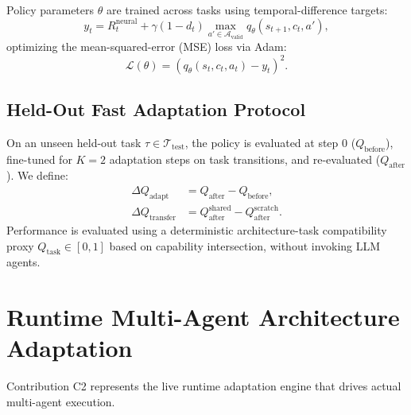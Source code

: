 \documentclass[conference]{IEEEtran}
\begin{document}
Policy parameters $\theta$ are trained across tasks using temporal-difference targets:
\begin{equation}
y_t = R_t^{\mathrm{neural}} + \gamma (1 - d_t) \max_{a' \in \mathcal{A}_{\mathrm{valid}}} q_\theta(s_{t+1}, c_t, a'),
\end{equation}
optimizing the mean-squared-error (MSE) loss via Adam:
\begin{equation}
\mathcal{L}(\theta) = \left(q_\theta(s_t, c_t, a_t) - y_t\right)^2.
\end{equation}

\subsection{Held-Out Fast Adaptation Protocol}
On an unseen held-out task $\tau \in \mathcal{T}_{\mathrm{test}}$, the policy is evaluated at step 0 ($Q_{\mathrm{before}}$), fine-tuned for $K = 2$ adaptation steps on task transitions, and re-evaluated ($Q_{\mathrm{after}}$). We define:
\begin{align}
\Delta Q_{\mathrm{adapt}} &= Q_{\mathrm{after}} - Q_{\mathrm{before}}, \\
\Delta Q_{\mathrm{transfer}} &= Q_{\mathrm{after}}^{\mathrm{shared}} - Q_{\mathrm{after}}^{\mathrm{scratch}}.
\end{align}
Performance is evaluated using a deterministic architecture-task compatibility proxy $Q_{\mathrm{task}} \in [0, 1]$ based on capability intersection, without invoking LLM agents.

\section{Runtime Multi-Agent Architecture Adaptation}
\label{sec:runtime_q_learning}

Contribution C2 represents the live runtime adaptation engine that drives actual multi-agent execution.
\end{document}
